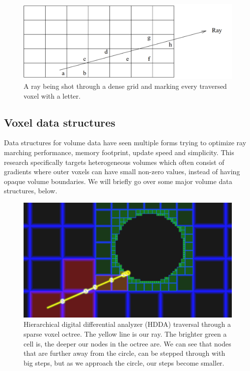 \begin{figure}
    \centering
    \includegraphics[width=\linewidth]{figures/dda.png}
    \caption{A ray being shot through a dense grid and marking every traversed voxel with a letter. \cite{amanatides1987fast}}
    \label{fig:dda_traversal}
\end{figure}

\subsection{Voxel data structures} \label{related_work:voxel_data_structures}
Data structures for volume data have seen multiple forms trying to optimize ray marching performance, memory footprint, update speed and simplicity. This research specifically targets heterogeneous volumes which often consist of gradients where outer voxels can have small non-zero values, instead of having opaque volume boundaries. We will briefly go over some major volume data structures, below.

\begin{figure}
    \centering
    \includegraphics[width=\linewidth]{figures/esvo_traversal.png}
    \caption{Hierarchical digital differential analyzer (HDDA) traversal through a sparse voxel octree. The yellow line is our ray. The brighter green a cell is, the deeper our nodes in the octree are. We can see that nodes that are further away from the circle, can be stepped through with big steps, but as we approach the circle, our steps become smaller. \cite{ShaderToyQuadtree}}
    \label{fig:esvo}
\end{figure}





